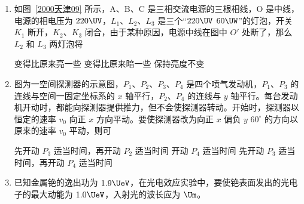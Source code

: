 \documentclass[\gkver]{gaokaozhenti}
\begin{document}
\begin{enumerate}
\item
如图~\ref{2000天津09} 所示，A、B、C 是三相交流电源的三根相线，O 是中线，电源的相电压为 $220\UV$，$L_{1}$、$L_{2}$、$L_{3}$ 是三个“$220\UV$ $60\UW$”的灯泡，开关 $K_{1}$ 断开，$K_{2}$、$K_{3}$ 闭合，由于某种原因，电源中线在图中 $O'$ 处断了，那么 $L_{2}$ 和 $L_{3}$ 两灯泡将 


{变得比原来亮一些}
{变得比原来暗一些}
{保持亮度不变}


\item
图为一空间探测器的示意图，$P_{1}$、$P_{2}$、$P_{3}$、$P_{4}$ 是四个喷气发动机，$P_{1}$、$P_{3}$ 的连线与空间一固定坐标系的 $x$ 轴平行，$P_{2}$、$P_{4}$ 的连线与 $y$ 轴平行。每台发动机开动时，都能向探测器提供推力，但不会使探测器转动。开始时，探测器以恒定的速率 $v_{0}$ 向正 $x$ 方向平动。要使探测器改为向正 $x$ 偏负 $y$ $60^{\circ}$ 的方向以原来的速率 $v_{0}$ 平动，则可 
\onepicture[w=6.61cm]{}

{先开动 $P_{3}$ 适当时间，再开动 $P_{2}$ 适当时间}
{开动 $P_{4}$ 适当时间}
{先开动 $P_{3}$ 适当时间，再开动 $P_{4}$ 适当时间}


\item
已知金属铯的逸出功为 $1.9\UeV$，在光电效应实验中，要使铯表面发出的光电子的最大动能为 $1.0\UeV$，入射光的波长应为  $\Um$。


\end{enumerate}
\end{document}
